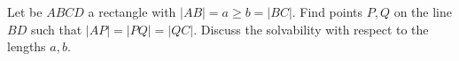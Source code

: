 Let be $ABCD$ a rectangle with $|AB|=a\ge b=|BC|$. Find points $P,Q$ on the line $BD$ such that $|AP|=|PQ|=|QC|$. Discuss the solvability with respect to the lengths $a,b$.